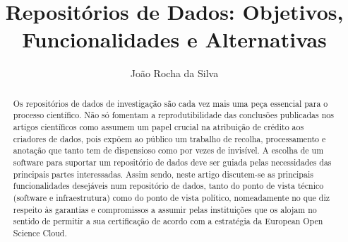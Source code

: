 \documentclass[sigconf,nonacm]{acmart}
\begin{document}
\title{Repositórios de Dados: Objetivos, Funcionalidades e Alternativas}

\author{João Rocha da Silva}

\renewcommand{\shortauthors}{João Rocha da Silva}

\begin{abstract}
    Os repositórios de dados de investigação são cada vez mais uma peça essencial para o processo científico. Não só fomentam a reprodutibilidade das conclusões publicadas nos artigos científicos como assumem um papel crucial na atribuição de crédito aos criadores de dados, pois expôem ao público um trabalho de recolha, processamento e anotação que tanto tem de dispensioso como por vezes de invisível.
    A escolha de um software para suportar um repositório de dados deve ser guiada pelas necessidades das principais partes interessadas. Assim sendo, neste artigo discutem-se as principais funcionalidades desejáveis num repositório de dados, tanto do ponto de vista técnico (software e infraestrutura) como do ponto de vista político, nomeadamente no que diz respeito às garantias e compromissos a assumir pelas instituições que os alojam no sentido de permitir a sua certificação de acordo com a estratégia da European Open Science Cloud.
\end{abstract}

\end{document}
